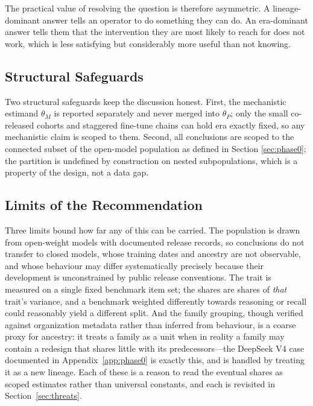 \documentclass{ieeeaccess}
\theoremstyle{definition}
\theoremstyle{plain}
\begin{document}
The practical value of resolving the question is therefore asymmetric. A
lineage-dominant answer tells an operator to do something they can do. An
era-dominant answer tells them that the intervention they are most likely to
reach for does not work, which is less satisfying but considerably more useful
than not knowing.

\subsection{Structural Safeguards}
Two structural safeguards keep the discussion honest. First, the mechanistic
estimand $\theta_{M}$ is reported separately and never merged into $\theta_{P}$;
only the small co-released cohorts and staggered fine-tune chains can hold era
exactly fixed, so any mechanistic claim is scoped to them. Second, all conclusions
are scoped to the connected subset of the open-model population as defined in
Section \ref{sec:phase0}; the partition is undefined by construction on nested
subpopulations, which is a property of the design, not a data gap.

\subsection{Limits of the Recommendation}
Three limits bound how far any of this can be carried. The population is drawn
from open-weight models with documented release records, so conclusions do not
transfer to closed models, whose training dates and ancestry are not
observable, and whose behaviour may differ systematically precisely because
their development is unconstrained by public release conventions. The trait is
measured on a single fixed benchmark item set; the shares are shares of
\emph{that} trait's variance, and a benchmark weighted differently towards
reasoning or recall could reasonably yield a different split. And the family
grouping, though verified against organization metadata rather than inferred
from behaviour, is a coarse proxy for ancestry: it treats a family as a unit
when in reality a family may contain a redesign that shares little with its
predecessors---the DeepSeek V4 case documented in Appendix~\ref{app:phase0} is
exactly this, and is handled by treating it as a new lineage. Each of these is
a reason to read the eventual shares as scoped estimates rather than universal
constants, and each is revisited in Section~\ref{sec:threats}.
\end{document}

